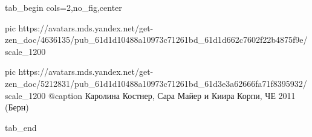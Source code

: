  
 
 
 
 


\ifcmt
  tab_begin cols=2,no_fig,center

     pic https://avatars.mds.yandex.net/get-zen_doc/4636135/pub_61d1d10488a10973c71261bd_61d1d662c7602f22b4875f9e/scale_1200

		 pic https://avatars.mds.yandex.net/get-zen_doc/5212831/pub_61d1d10488a10973c71261bd_61d3e3a62666fa71f8395932/scale_1200
		 @caption Каролина Костнер, Сара Майер и Киира Корпи, ЧЕ 2011 (Берн)

  tab_end
\fi
